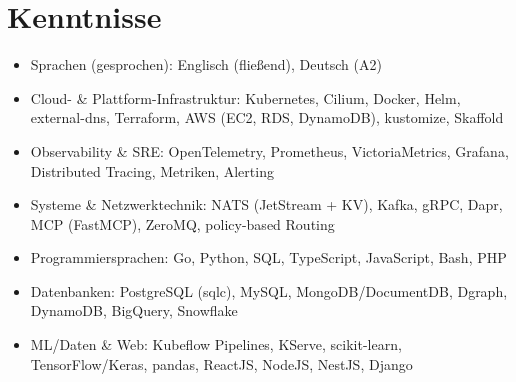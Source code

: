 \documentclass[10pt,a4paper]{resume}
\begin{document}
\section{Kenntnisse}

\begin{itemize}[leftmargin=1.4em,nosep,topsep=2pt]
  \item Sprachen (gesprochen): Englisch (fließend), Deutsch (A2)
  \item Cloud- \& Plattform-Infrastruktur: Kubernetes, Cilium, Docker, Helm, external-dns, Terraform, AWS (EC2, RDS, DynamoDB), kustomize, Skaffold
  \item Observability \& SRE: OpenTelemetry, Prometheus, VictoriaMetrics, Grafana, Distributed Tracing, Metriken, Alerting
  \item Systeme \& Netzwerktechnik: NATS (JetStream + KV), Kafka, gRPC, Dapr, MCP (FastMCP), ZeroMQ, policy-based Routing
  \item Programmiersprachen: Go, Python, SQL, TypeScript, JavaScript, Bash, PHP
  \item Datenbanken: PostgreSQL (sqlc), MySQL, MongoDB/DocumentDB, Dgraph, DynamoDB, BigQuery, Snowflake
  \item ML/Daten \& Web: Kubeflow Pipelines, KServe, scikit-learn, TensorFlow/Keras, pandas, ReactJS, NodeJS, NestJS, Django
\end{itemize}
\end{document}
